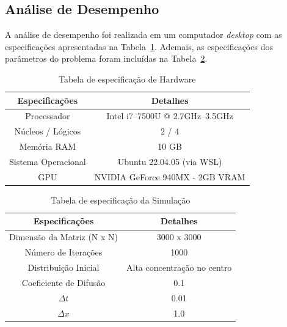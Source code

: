 \documentclass[12pt]{article}
\begin{document}
\subsection{Análise de Desempenho}

A análise de desempenho foi realizada em um computador \textit{desktop} com as
especificações apresentadas na Tabela~\ref{tab:especificacaoHardware}. Ademais,
as especificações dos parâmetros do problema foram incluídas na
Tabela~\ref{tab:especificacaoSimulacao}.

\begin{table}[ht]
  \centering
  \caption{Tabela de especificação de Hardware}
  \vspace{0.3cm}
  \begin{tabular}{||c c||}
    \hline
    Especificações      & Detalhes                         \\ [0.5ex]
    \hline\hline
    Processador         & Intel i7--7500U @ 2.7GHz--3.5GHz \\
    \hline
    Núcleos / Lógicos   & 2 / 4                            \\
    \hline
    Memória RAM         & 10 GB                            \\
    \hline
    Sistema Operacional & Ubuntu 22.04.05 (via WSL)        \\
    \hline
    GPU                 & NVIDIA GeForce 940MX - 2GB VRAM  \\
    \hline
  \end{tabular}\label{tab:especificacaoHardware}
\end{table}

\begin{table}[ht]
  \centering
  \caption{Tabela de especificação da Simulação}
  \vspace{0.3cm}
  \begin{tabular}{||c c||}
    \hline
    Especificações             & Detalhes                    \\ [0.5ex]
    \hline\hline
    Dimensão da Matriz (N x N) & 3000 x 3000                 \\
    \hline
    Número de Iterações        & 1000                        \\
    \hline
    Distribuição Inicial       & Alta concentração no centro \\
    \hline
    Coeficiente de Difusão     & 0.1                         \\
    \hline
    $\Delta t$                 & 0.01                        \\
    \hline
    $\Delta x$                 & 1.0                         \\
    \hline
  \end{tabular}\label{tab:especificacaoSimulacao}
\end{table}
\end{document}
